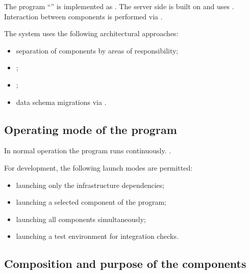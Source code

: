 \documentclass[12pt,a4paper]{extarticle}
\begin{document}
\begin{hseExample}
The program \enquote{\projectname} is implemented as . The server side is built on  and uses . Interaction between components is performed via .

The system uses the following architectural approaches:

\begin{itemize}[leftmargin=1.25cm]
    \item separation of components by areas of responsibility;
    \item {};
    \item {};
    \item data schema migrations via .
\end{itemize}
\end{hseExample}

\subsection{Operating mode of the program}

\begin{hseExample}
In normal operation the program runs continuously. .

For development, the following launch modes are permitted:

\begin{itemize}[leftmargin=1.25cm]
    \item launching only the infrastructure dependencies;
    \item launching a selected component of the program;
    \item launching all components simultaneously;
    \item launching a test environment for integration checks.
\end{itemize}
\end{hseExample}

\subsection{Composition and purpose of the components}
\end{document}
